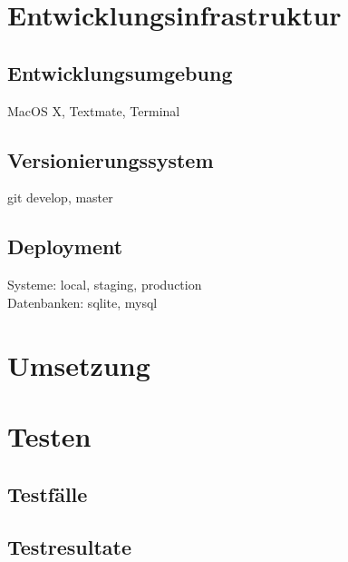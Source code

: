 \section{Entwicklungsinfrastruktur}

\subsection{Entwicklungsumgebung}
MacOS X, Textmate, Terminal

\subsection{Versionierungssystem}
git develop, master

\subsection{Deployment}
Systeme: local, staging, production\\
Datenbanken: sqlite, mysql

\section{Umsetzung}

\section{Testen}

\subsection{Testfälle}

\subsection{Testresultate}